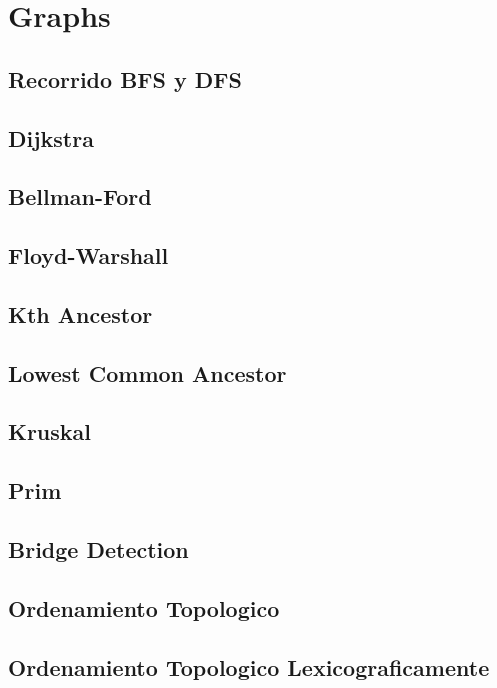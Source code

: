\section{Graphs}
\subsection{Recorrido BFS y DFS}
\raggedbottom
\hrulefill
\subsection{Dijkstra}
\raggedbottom
\hrulefill
\subsection{Bellman-Ford}
\raggedbottom
\hrulefill
\subsection{Floyd-Warshall}
\raggedbottom
\hrulefill
\subsection{Kth Ancestor}
\raggedbottom
\hrulefill
\subsection{Lowest Common Ancestor}
\raggedbottom
\hrulefill
\subsection{Kruskal}
\raggedbottom
\hrulefill
\subsection{Prim}
\raggedbottom
\hrulefill
\subsection{Bridge Detection}
\raggedbottom
\hrulefill
\subsection{Ordenamiento Topologico}
\raggedbottom
\hrulefill
\subsection{Ordenamiento Topologico Lexicograficamente}
\raggedbottom
\hrulefill


